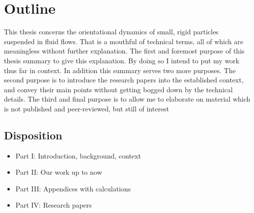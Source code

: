 \documentclass[thesis.tex]{subfiles}
\begin{document}
\chapter{Outline}

This thesis concerns the orientational dynamics of small, rigid particles suspended in fluid flows. That is a mouthful of technical terms, all of which are meaningless without further explanation. The first and foremost purpose of this thesis summary to give this explanation. By doing so I intend to put my work thus far in context. In addition this summary serves two more purposes. The second purpose is to introduce the research papers into the established context, and convey their main points without getting bogged down by the technical details. The third and final purpose is to allow me to elaborate on material which is not published and peer-reviewed, but still of interest 

\section{Disposition}

\begin{itemize}
	\item Part I: Introduction, background, context
	\item Part II: Our work up to now
	\item Part III: Appendices with calculations
	\item Part IV: Research papers
\end{itemize}
\end{document}
